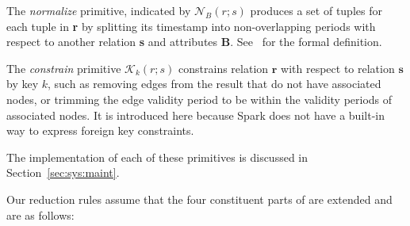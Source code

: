 The {\em normalize} primitive, indicated by $\mathcal{N}_B(r;s)$
produces a set of tuples for each tuple in {\bf r} by splitting its
timestamp into non-overlapping periods with respect to another
relation {\bf s} and attributes {\bf B}.  See~\cite{Dignos2012} for
the formal definition.

The {\em constrain} primitive $\mathcal{K}_k(r;s)$ constrains relation
$\mathbf{r}$ with respect to relation $\mathbf{s}$ by key $k$, such as
removing edges from the result that do not have associated nodes, or
trimming the edge validity period to be within the validity periods of
associated nodes.  It is introduced here because Spark does not have a
built-in way to express foreign key constraints.

The implementation of each of these primitives is discussed in
Section~\ref{sec:sys:maint}.

Our reduction rules assume that the four constituent parts of \tve are
extended and are as follows:

